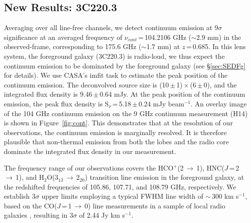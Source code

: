 \documentclass[twocolumn,apj,numberedappendix]{emulateapj}
\newcommand{\rarr}{$\rightarrow$}
\newcommand{\pmOne}{\mbox{$^{-1}$}}
\begin{document}
\subsection{New Results: 3C220.3} 
Averaging over all line-free channels, we detect continuum emission at 9$\sigma$ significance at an averaged frequency of $\nu_{cont}$\,=\,104.2106 GHz ($\sim$2.9 mm) in the observed-frame, corresponding to 175.6 GHz ($\sim$1.7 mm) at $z$\,=\,0.685. In this lens system, the 
foreground galaxy (3C220.3) is radio-loud, we thus expect the continuum emission to be dominated by the foreground galaxy (see \S \ref{sec:SEDFg} for details). We use CASA's {\sc imfit} task to estimate the peak position of the continuum emission. The deconvolved source size is (10\,$\pm$\,1)\,$\times$\,(6\,$\pm$\,0), and the integrated flux density is 9.46\,$\pm$\,0.64\,\,mJy. At the peak position of the continuum emission, the peak flux density is S$_\nu$\,=\,5.18\,$\pm$\,0.24\,\,mJy\,\,beam\pmOne. An overlay image of the 104 GHz continuum emission on the 9 GHz continuum measurement (H14) is shown in Figure~\ref{fig:cont}. This demonstrates that at the resolution of our observations, the continuum emission is marginally resolved. It is therefore plausible that non-thermal emission from both the lobes and the radio core dominate the integrated flux density in our measurement.

The frequency range of our observations covers the HCO$^+$(2\,\rarr\,1), HNC($J$\,=\,2\,$\rightarrow$\,1), and H$_2$O(3$_{13}$\,\rarr\,2$_{20}$) 
transition line emission in the foreground galaxy, at 
the redshifted frequencies of 105.86, 107.71, and 108.79\,\,GHz, respectively. We establish 3$\sigma$ upper limits employing a typical FWHM line width of 
$\sim$\,300\,\,km\,\,s\pmOne, based on the CO($J$\,=\,1\,$\rightarrow$\,0) line measurements in a sample of local radio galaxies \citep[$z$ $<$ 0.1; ][]{Smolcic11a}, resulting in 3$\sigma$ of 2.44\,\,Jy\,\,km\,\,s\pmOne.
\end{document}
